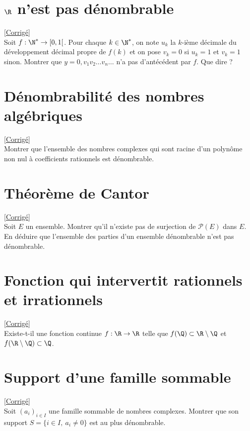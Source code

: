 \documentclass[8pt]{book}
\begin{document}
\section{$\R$ n'est pas dénombrable }
\label{R n'est pas dénombrable}
\textcolor{blue}{\hyperref[R n'est pas dénombrable corrigé]{[Corrigé]}}\\
Soit $f:\N^*\to [0,1[$. Pour chaque $k\in \N^*$, on note $u_k$ la $k$-ième décimale du développement décimal propre de $f(k)$ et on pose $v_k=0$ si $u_k=1$ et $v_k=1$ sinon. Montrer que $y=0,v_1v_2\dots v_n\dots$ n'a pas d'antécédent par $f$. Que dire ?

\section{Dénombrabilité des nombres algébriques }
\label{Dénombrabilité des nombres algébriques}
\textcolor{blue}{\hyperref[Dénombrabilité des nombres algébriques corrigé]{[Corrigé]}}\\
Montrer que l'ensemble des nombres complexes qui sont racine d'un polynôme non nul à coefficients rationnels est dénombrable.

\section{Théorème de Cantor }
\label{Théorème de Cantor}
\textcolor{blue}{\hyperref[Théorème de Cantor corrigé]{[Corrigé]}}\\
Soit $E$ un ensemble. Montrer qu'il n'existe pas de surjection de $\mathcal P(E)$ dans $E$.\\
En déduire que l'ensemble des parties d'un ensemble dénombrable n'est pas dénombrable.

\section{Fonction qui intervertit rationnels et irrationnels }
\label{Fonction qui intervertit rationnels et irrationnels}
\textcolor{blue}{\hyperref[Fonction qui intervertit rationnels et irrationnels corrigé]{[Corrigé]}}\\
Existe-t-il une fonction continue $f:\R\to\R$ telle que $f(\Q)\subset \R\setminus\Q$ et $f(\R\setminus\Q)\subset \Q$.

\section{Support d'une famille sommable }
\label{Support d'une famille sommable}
\textcolor{blue}{\hyperref[Support d'une famille sommable corrigé]{[Corrigé]}}\\
Soit $(a_i)_{i\in I}$ une famille sommable de nombres complexes. Montrer que son support $S=\{i\in I,\ a_i\ne 0\}$ est au plus dénombrable.
\end{document}
